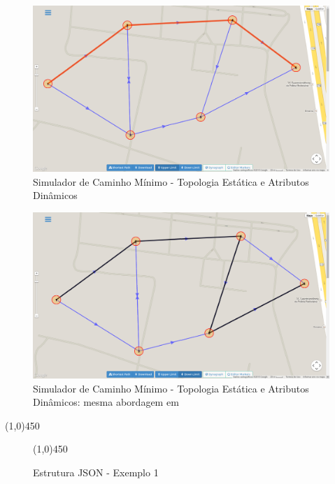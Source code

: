 \begin{figure}[htbp]
\centering
 \includegraphics[width=.90\textwidth]{chapters/fig/validacao/upperlimit.png}
\caption{Simulador de Caminho Mínimo - Topologia Estática e Atributos Dinâmicos}
\label{fig:upperlimit}
\end{figure}
\FloatBarrier

\begin{figure}[htbp]
\centering
 \includegraphics[width=.90\textwidth]{chapters/fig/validacao/downlimit.png}
\caption{Simulador de Caminho Mínimo - Topologia Estática e Atributos Dinâmicos: mesma abordagem em \cite{leonard}}
\label{fig:downlimit}
\end{figure}
\FloatBarrier

\begin{center}
  \line(1,0){450}
\end{center}

\begin{figure}[htbp]
  \begin{center}
    \line(1,0){450}
  \end{center}
  \centering
  \caption{Estrutura JSON - Exemplo 1}
  \label{fig:jsondyn}
\end{figure}
\FloatBarrier

